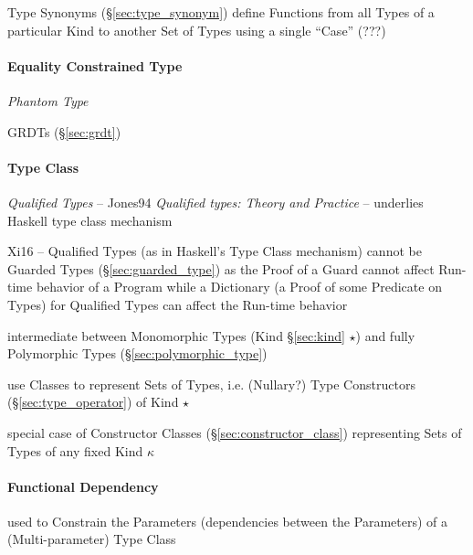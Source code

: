 \fist Type Synonyms (\S\ref{sec:type_synonym}) define Functions from
all Types of a particular Kind to another Set of Types using a single
``Case'' (???) %



\paragraph{Equality Constrained Type}
\label{sec:equality_constrained}\hfill

\emph{Phantom Type}

\fist GRDTs (\S\ref{sec:grdt})



\paragraph{Type Class}\label{sec:type_class}\hfill

\emph{Qualified Types} -- \cite{jones94} Jones94 \emph{Qualified
  types: Theory and Practice} -- underlies Haskell type class
mechanism

Xi16 -- Qualified Types (as in Haskell's Type Class mechanism) cannot
be Guarded Types (\S\ref{sec:guarded_type}) as the Proof of a Guard
cannot affect Run-time behavior of a Program while a Dictionary (a
Proof of some Predicate on Types) for Qualified Types can affect the
Run-time behavior

\cite{jones95}

intermediate between Monomorphic Types (Kind \S\ref{sec:kind} $\star$)
and fully Polymorphic Types (\S\ref{sec:polymorphic_type})

use Classes to represent Sets of Types, i.e. (Nullary?) Type
Constructors (\S\ref{sec:type_operator}) of Kind $\star$

special case of Constructor Classes (\S\ref{sec:constructor_class})
representing Sets of Types of any fixed Kind $\kappa$



\paragraph{Functional Dependency}\label{sec:functional_dependency}\hfill

used to Constrain the Parameters (dependencies between the Parameters)
of a (Multi-parameter) Type Class





